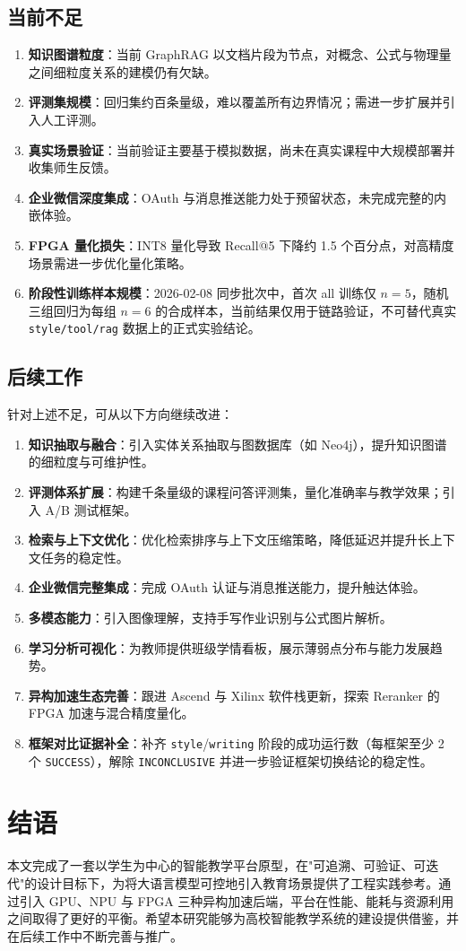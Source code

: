 \subsection{当前不足}
\begin{enumerate}[label=(\arabic*)]
  \item \textbf{知识图谱粒度}：当前 GraphRAG 以文档片段为节点，对概念、公式与物理量之间细粒度关系的建模仍有欠缺。
  \item \textbf{评测集规模}：回归集约百条量级，难以覆盖所有边界情况；需进一步扩展并引入人工评测。
  \item \textbf{真实场景验证}：当前验证主要基于模拟数据，尚未在真实课程中大规模部署并收集师生反馈。
  \item \textbf{企业微信深度集成}：OAuth 与消息推送能力处于预留状态，未完成完整的内嵌体验。
  \item \textbf{FPGA 量化损失}：INT8 量化导致 Recall@5 下降约 1.5 个百分点，对高精度场景需进一步优化量化策略。
  \item \textbf{阶段性训练样本规模}：2026-02-08 同步批次中，首次 all 训练仅 $n=5$，随机三组回归为每组 $n=6$ 的合成样本，当前结果仅用于链路验证，不可替代真实 \texttt{style/tool/rag} 数据上的正式实验结论。
\end{enumerate}

\subsection{后续工作}
针对上述不足，可从以下方向继续改进：
\begin{enumerate}[label=(\arabic*)]
  \item \textbf{知识抽取与融合}：引入实体关系抽取与图数据库（如 Neo4j），提升知识图谱的细粒度与可维护性。
  \item \textbf{评测体系扩展}：构建千条量级的课程问答评测集，量化准确率与教学效果；引入 A/B 测试框架。
  \item \textbf{检索与上下文优化}：优化检索排序与上下文压缩策略，降低延迟并提升长上下文任务的稳定性。
  \item \textbf{企业微信完整集成}：完成 OAuth 认证与消息推送能力，提升触达体验。
  \item \textbf{多模态能力}：引入图像理解，支持手写作业识别与公式图片解析。
  \item \textbf{学习分析可视化}：为教师提供班级学情看板，展示薄弱点分布与能力发展趋势。
  \item \textbf{异构加速生态完善}：跟进 Ascend 与 Xilinx 软件栈更新，探索 Reranker 的 FPGA 加速与混合精度量化。
  \item \textbf{框架对比证据补全}：补齐 \texttt{style}/\texttt{writing} 阶段的成功运行数（每框架至少 2 个 \texttt{SUCCESS}），解除 \texttt{INCONCLUSIVE} 并进一步验证框架切换结论的稳定性。
\end{enumerate}

\section{结语}
本文完成了一套以学生为中心的智能教学平台原型，在"可追溯、可验证、可迭代"的设计目标下，为将大语言模型可控地引入教育场景提供了工程实践参考。通过引入 GPU、NPU 与 FPGA 三种异构加速后端，平台在性能、能耗与资源利用之间取得了更好的平衡。希望本研究能够为高校智能教学系统的建设提供借鉴，并在后续工作中不断完善与推广。
